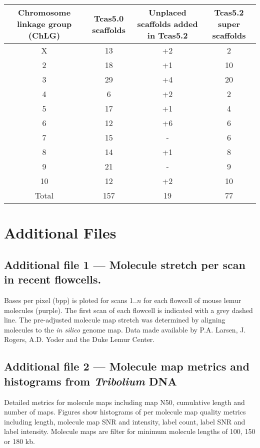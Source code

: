 \documentclass{bmcart}
\begin{document}
\begin{backmatter}
\begin{table}[h!]
\begin{tabular}{cccc}
		\hline
		Chromosome linkage group (ChLG) & Tcas5.0 scaffolds & Unplaced scaffolds added in Tcas5.2 & Tcas5.2 super scaffolds \\ \hline
		X & 13 & +2 & 2\\
		2 & 18 & +1 & 10\\
		3 & 29 & +4 & 20\\
		4 & 6 & +2 & 2\\
		5 & 17 & +1 & 4\\
		6 & 12 & +6 & 6\\
		7 & 15 & - & 6\\
		8 & 14 & +1 & 8\\
		9 & 21 & - & 9\\
		10 & 12 & +2 & 10\\ \hline
		Total & 157 & 19 & 77\\ \hline
	\end{tabular}
\end{table}




\section*{Additional Files}

\subsection*{Additional file 1 --- Molecule stretch per scan in recent flowcells.} Bases per pixel (bpp) is ploted for scans 1..$n$ for each flowcell of mouse lemur molecules (purple). The first scan of each flowcell is indicated with a grey dashed line. The pre-adjusted molecule map stretch was determined by aligning molecules to the \textit{in silico} genome map. Data made available by P.A. Larsen, J. Rogers, A.D. Yoder and the Duke Lemur Center.

  \subsection*{Additional file 2 --- Molecule map metrics and histograms from \textit{Tribolium} DNA}
    Detailed metrics for molecule maps including map N50, cumulative length and number of maps. Figures show histograms of per molecule map quality metrics including length, molecule map SNR and intensity, label count, label SNR and label intensity. Molecule maps are filter for minimum molecule lengths of 100, 150 or 180 kb.


\end{backmatter}
\end{document}
